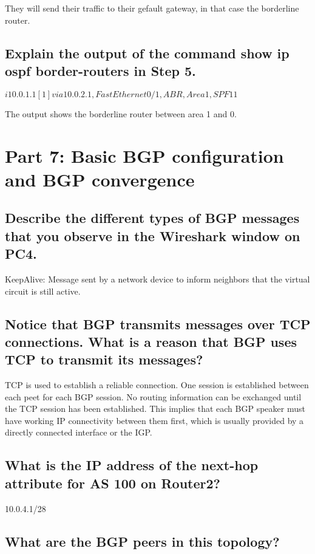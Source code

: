 \documentclass[a4paper, 11pt]{article}
\begin{document}
They will send their traffic to their gefault gateway, in that case the borderline router.

\subsection{Explain the output of the command show ip ospf border-routers in Step 5. }

$i 10.0.1.1 [1] via 10.0.2.1, FastEthernet0/1, ABR, Area 1, SPF 11$

The output shows the borderline router between area 1 and 0.

\section{Part 7: Basic BGP configuration and BGP convergence}

\subsection{Describe the different types of BGP messages that you observe in the Wireshark window on PC4. }

KeepAlive: Message sent by a network device to inform neighbors that the virtual circuit is still active.

\subsection{Notice that BGP transmits messages over TCP connections. What is a reason that BGP uses TCP to transmit its messages? }

TCP is used to establish a reliable connection. One session is established between each peet for each BGP session. No routing information can be exchanged until the TCP session has been established.  This implies that each BGP speaker must have working IP connectivity between them first, which is usually provided by a directly connected interface or the IGP. 

\subsection{What is the IP address of the next-hop attribute for AS 100 on Router2? }

10.0.4.1/28

\subsection{What are the BGP peers in this topology? }
\end{document}
